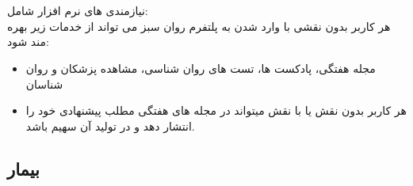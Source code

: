 \documentclass[a4paper]{article}
\begin{document}
	
	\section{}
	نیازمندی های   نرم افزار شامل:\\
	هر کاربر بدون نقشی با وارد شدن به پلتفرم روان سبز می تواند از خدمات زیر بهره مند شود:
	\begin{itemize}
		
		\item مجله هفتگی، پادکست ها، تست های روان شناسی، مشاهده پزشکان و روان شناسان
		\item هر کاربر بدون نقش یا با نقش میتواند در مجله های هفتگی مطلب پیشنهادی خود را انتشار دهد و در تولید آن سهیم باشد.
		
	\end{itemize}
		
		\subsection{بیمار}
		
\end{document}
